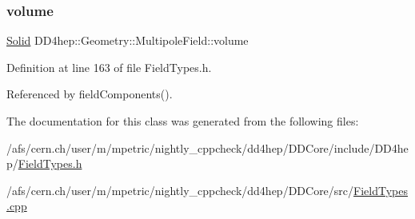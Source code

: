 \subsubsection{\texorpdfstring{volume}{volume}}
{\footnotesize\ttfamily \hyperlink{namespace_d_d4hep_1_1_geometry_a83de90a8dcc7378ba47d54ef9a6a687b}{Solid} D\+D4hep\+::\+Geometry\+::\+Multipole\+Field\+::volume}



Definition at line 163 of file Field\+Types.\+h.



Referenced by field\+Components().



The documentation for this class was generated from the following files\+:\begin{DoxyCompactItemize}
\item 
/afs/cern.\+ch/user/m/mpetric/nightly\+\_\+cppcheck/dd4hep/\+D\+D\+Core/include/\+D\+D4hep/\hyperlink{_field_types_8h}{Field\+Types.\+h}\item 
/afs/cern.\+ch/user/m/mpetric/nightly\+\_\+cppcheck/dd4hep/\+D\+D\+Core/src/\hyperlink{_field_types_8cpp}{Field\+Types.\+cpp}\end{DoxyCompactItemize}
